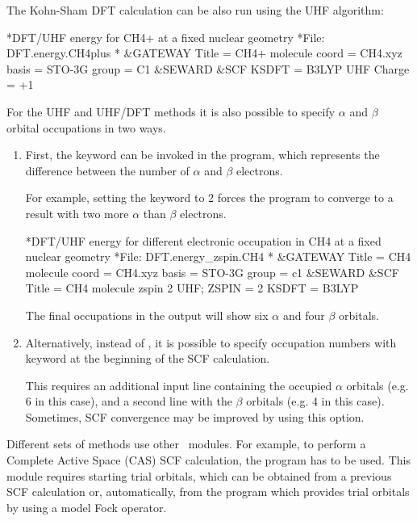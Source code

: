 The Kohn-Sham DFT calculation can be also run using the UHF algorithm:

\begin{inputlisting}
*DFT/UHF energy for CH4+ at a fixed nuclear geometry
*File: DFT.energy.CH4plus
*
&GATEWAY
 Title = CH4+ molecule
 coord = CH4.xyz 
 basis = STO-3G 
 group = C1
&SEWARD
&SCF 
 KSDFT = B3LYP
 UHF
 Charge = +1
\end{inputlisting}

For the UHF and UHF/DFT methods it is also possible to specify 
$\alpha$ and $\beta$ orbital occupations in two ways. 
\begin{enumerate}
\item First, the keyword  can be invoked in the  program, which represents the 
difference between the number of $\alpha$ and $\beta$ electrons. 

For example, setting the keyword to 2 forces the program to converge to a result with two more $\alpha$ than $\beta$ electrons.

\begin{inputlisting}
*DFT/UHF energy for different electronic occupation in CH4 at a fixed nuclear geometry
*File: DFT.energy_zspin.CH4
*
&GATEWAY
 Title = CH4 molecule 
 coord = CH4.xyz 
 basis = STO-3G 
 group = c1
&SEWARD
&SCF
 Title = CH4 molecule zspin 2
 UHF; ZSPIN =  2
 KSDFT =  B3LYP
\end{inputlisting}

The final occupations in the output will show six $\alpha$ and four $\beta$ orbitals.

\item Alternatively, instead of , it is possible to specify 
occupation numbers with keyword  at the beginning of the SCF calculation. 

This requires an additional input line containing the occupied $\alpha$ orbitals (e.g. 6 in this case), and a second line 
with the $\beta$ orbitals (e.g. 4 in this case). Sometimes, SCF convergence may be improved by using this option.
\end{enumerate}

Different sets of methods use other \molcas\ modules. For example, to perform a Complete
Active Space (CAS) SCF calculation, the  program has to be used. This
module requires starting trial orbitals, which can be obtained from a previous SCF
calculation or, automatically, from the  program which provides trial orbitals by
using a model Fock operator. 

